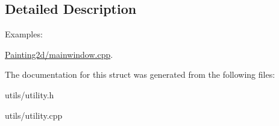 \subsection{Detailed Description}
\begin{Desc}
\item[Examples\+: ]\par
\hyperlink{_painting2d_2mainwindow_8cpp-example}{Painting2d/mainwindow.\+cpp}.\end{Desc}


The documentation for this struct was generated from the following files\+:\begin{DoxyCompactItemize}
\item 
utils/utility.\+h\item 
utils/utility.\+cpp\end{DoxyCompactItemize}
